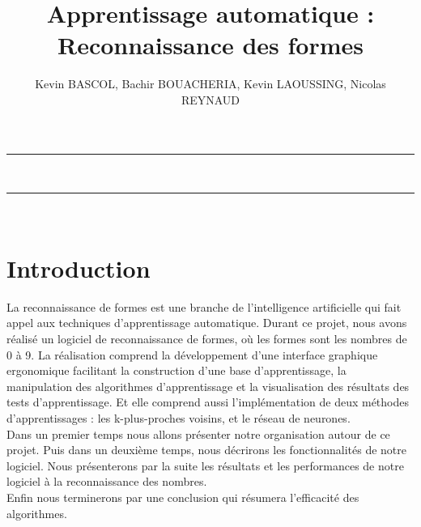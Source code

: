 \documentclass[10pt,a4paper]{report}
\author{Kevin BASCOL, Bachir BOUACHERIA, Kevin LAOUSSING, Nicolas REYNAUD}
\title{ Apprentissage automatique : Reconnaissance des formes}
\begin{document}
\makeatletter
	\begin{titlepage}
	
	\centering
		{
		\vspace*{5cm}
		\hrule height 2pt
		\vspace{0.7cm}
		\Huge \textbf{\@title}}\\
		\vspace{0.7cm}
		\hrule height 2pt
		
		\vfill
		\vspace{1cm}
		\@author\\
		\end{titlepage}
\makeatother
\setcounter{secnumdepth}{4}
\setcounter{tocdepth}{3}
\renewcommand{\contentsname}{Sommaire}
\begingroup\makeatletter
\def\@makeschapterhead#1{%
  {\parindent \z@ \raggedright
    \normalfont
    \interlinepenalty\@M
    \Huge \bfseries  #1\par\nobreak
    \vskip 20pt%
  }}\makeatother
\tableofcontents
\endgroup
\thispagestyle{empty}
\setcounter{page}{0}
\newpage


\section{Introduction}
\begin{flushleft}

La reconnaissance de formes est une branche de l'intelligence artificielle qui fait appel aux techniques d'apprentissage automatique. Durant ce projet, nous avons réalisé un logiciel de reconnaissance de formes, où les formes sont les nombres de 0 à 9.
La réalisation comprend la développement d'une interface graphique ergonomique facilitant la construction d'une base d'apprentissage, la manipulation des algorithmes d'apprentissage et la visualisation des résultats des tests d'apprentissage. Et elle comprend aussi l'implémentation de deux méthodes d'apprentissages : les k-plus-proches voisins, et le réseau de neurones.\\
Dans un premier temps nous allons présenter notre organisation autour de ce projet. Puis dans un deuxième temps, nous décrirons les fonctionnalités de notre logiciel. Nous présenterons par la suite les résultats et les performances de notre logiciel à la reconnaissance des nombres.\\
Enfin nous terminerons par une conclusion qui résumera l'efficacité des algorithmes.


\end{flushleft}
\end{document}
